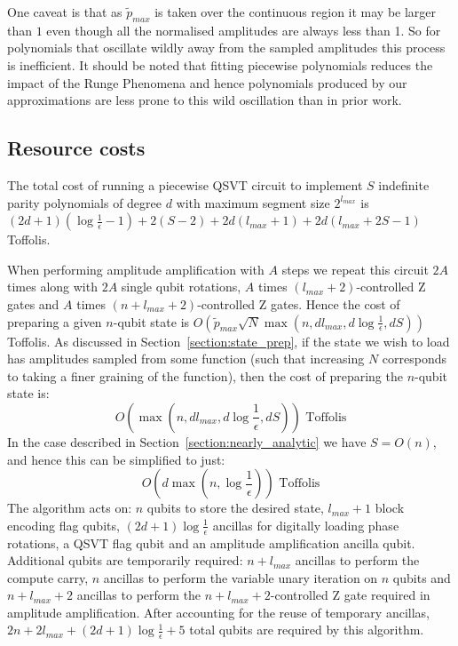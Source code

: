 One caveat is that as $\tilde{p}_{max}$ is taken over the continuous region it may be larger than $1$ even though all the normalised amplitudes are always less than 1. So for polynomials that oscillate wildly away from the sampled amplitudes this process is inefficient. It should be noted that fitting piecewise polynomials reduces the impact of the Runge Phenomena and hence polynomials produced by our approximations are less prone to this wild oscillation than in prior work. 
\subsection{Resource costs}
\label{section:resource}
The total cost of running a piecewise QSVT circuit to implement $S$ indefinite parity polynomials of degree $d$ with maximum segment size $2^{l_{max}}$ is $(2d+1)(\log\frac{1}{\epsilon}-1) + 2(S-2) + 2d(l_{max}+1) + 2d(l_{max} + 2S -1)$ Toffolis. 

When performing amplitude amplification with $A$ steps we repeat this circuit $2A$ times along with $2A$ single qubit rotations, $A$ times $(l_{max}+2)$-controlled Z gates and $A$ times $(n+l_{max}+2)$-controlled Z gates. Hence the cost of preparing a given $n$-qubit state is $O\left(\tilde{p}_{max}\sqrt{N}\max(n,dl_{max},d\log \frac{1}{\epsilon}, dS)\right)$ Toffolis. As discussed in Section~\ref{section:state_prep}, if the state we wish to load has amplitudes sampled from some function (such that increasing $N$ corresponds to taking a finer graining of the function), then the cost of preparing the $n$-qubit state is:
\begin{equation}
    O\left(\max\left(n,dl_{max},d\log \frac{1}{\epsilon}, dS\right)\right) \text{ Toffolis}
\end{equation}
In the case described in Section~\ref{section:nearly_analytic} we have $S = O(n)$, and hence this can be simplified to just:
\begin{equation}
    O\left(d\max\left(n, \log \frac{1}{\epsilon}\right)\right)  \text{ Toffolis}
\end{equation}
The algorithm acts on: $n$ qubits to store the desired state, $l_{max} + 1$ block encoding flag qubits, $(2d+1)\log\frac{1}{\epsilon}$ ancillas for digitally loading phase rotations, a QSVT flag qubit and an amplitude amplification ancilla qubit. Additional qubits are temporarily required: $n + l_{max}$ ancillas to perform the compute carry, $n$ ancillas to perform the variable unary iteration on $n$ qubits and $n+l_{max}+2$ ancillas to perform the $n+l_{max} +2$-controlled Z gate required in amplitude amplification. After accounting for the reuse of temporary ancillas, $2n + 2l_{max} + (2d+1)\log\frac{1}{\epsilon} + 5$ total qubits are required by this algorithm.


